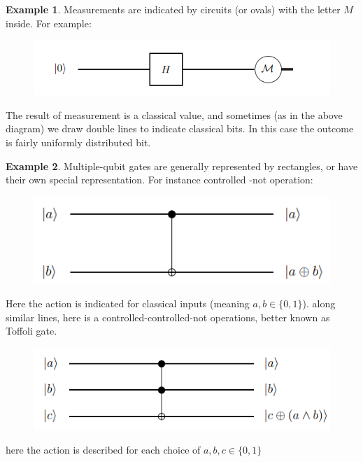 \documentclass[12pt, oneside]{book}
\theoremstyle{definition}
\theoremstyle{definition}
\newtheorem{example}{Example}[section]
\theoremstyle{remark}
\begin{document}
\begin{example}
    Measurements are indicated by circuits (or ovals) with the letter $M$ inside. For example:
\begin{figure}[H]
    \centering
    \includegraphics[width=0.65\linewidth]{../images/circ_exe4.png}
\end{figure}
    The result of measurement is a classical value, and sometimes (as in the above diagram) we draw double lines to indicate classical bits. In this case the outcome is fairly uniformly distributed bit.
\end{example}
\begin{example}
    Multiple-qubit gates are generally represented by rectangles, or have their own special representation. For instance controlled -not operation:
    \begin{figure}[H]
        \centering
        \includegraphics[width=0.65\linewidth]{../images/circ-exe5_1.png}
    \end{figure}
    Here the action is indicated for classical inputs (meaning $a,b \in \{0,1\}$). along similar lines, here is a controlled-controlled-not operations, better known as Toffoli gate.
\begin{figure}[H]
    \centering
    \includegraphics[width=0.65\linewidth]{../images/circ_exe5_b.png}
\end{figure}
    here the action is described for each choice of $a,b,c \in \{0,1\}$
\end{example}
\end{document}

